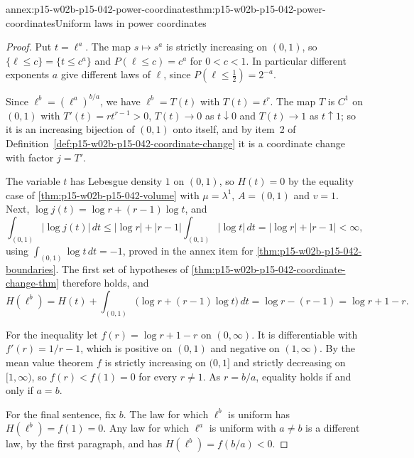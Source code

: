 \begin{annexitem}{annex:p15-w02b-p15-042-power-coordinates}{thm:p15-w02b-p15-042-power-coordinates}{Uniform laws in power coordinates}
\begin{proof}
Put \(t=\ell^a\). The map \(s\mapsto s^a\) is strictly increasing on
\((0,1)\), so \(\{\ell\leq c\}=\{t\leq c^a\}\) and \(P(\ell\leq c)=c^a\)
for \(0<c<1\). In particular different exponents \(a\) give different
laws of \(\ell\), since \(P(\ell\leq\tfrac12)=2^{-a}\).

Since \(\ell^b=(\ell^a)^{b/a}\), we have \(\ell^b=T(t)\) with
\(T(t)=t^r\). The map \(T\) is \(C^1\) on \((0,1)\) with
\(T'(t)=rt^{r-1}>0\), \(T(t)\to0\) as \(t\downarrow0\) and \(T(t)\to1\) as
\(t\uparrow1\); so it is an increasing bijection of \((0,1)\) onto itself,
and by item~2 of
Definition~\ref{def:p15-w02b-p15-042-coordinate-change} it is a coordinate
change with factor \(j=T'\).

The variable \(t\) has Lebesgue density \(1\) on \((0,1)\), so \(H(t)=0\) by
the equality case of \cref{thm:p15-w02b-p15-042-volume} with
\(\mu=\lambda^1\), \(A=(0,1)\) and \(v=1\). Next,
\(\log j(t)=\log r+(r-1)\log t\), and
\[
 \int_{(0,1)}|\log j(t)|\,dt\leq|\log r|+|r-1|\int_{(0,1)}|\log t|\,dt
   =|\log r|+|r-1|<\infty ,
\]
using \(\int_{(0,1)}\log t\,dt=-1\), proved in the annex item for
\cref{thm:p15-w02b-p15-042-boundaries}. The first set of hypotheses of
\cref{thm:p15-w02b-p15-042-coordinate-change-thm} therefore holds, and
\[
 H(\ell^b)=H(t)+\int_{(0,1)}\bigl(\log r+(r-1)\log t\bigr)\,dt
          =\log r-(r-1)=\log r+1-r .
\]

For the inequality let \(f(r)=\log r+1-r\) on \((0,\infty)\). It is
differentiable with \(f'(r)=1/r-1\), which is positive on \((0,1)\) and
negative on \((1,\infty)\). By the mean value theorem \(f\) is strictly
increasing on \((0,1]\) and strictly decreasing on \([1,\infty)\), so
\(f(r)<f(1)=0\) for every \(r\neq1\). As \(r=b/a\), equality holds if and only
if \(a=b\).

For the final sentence, fix \(b\). The law for which \(\ell^b\) is uniform
has \(H(\ell^b)=f(1)=0\). Any law for which \(\ell^a\) is uniform with
\(a\neq b\) is a different law, by the first paragraph, and has
\(H(\ell^b)=f(b/a)<0\).
\end{proof}
\end{annexitem}
